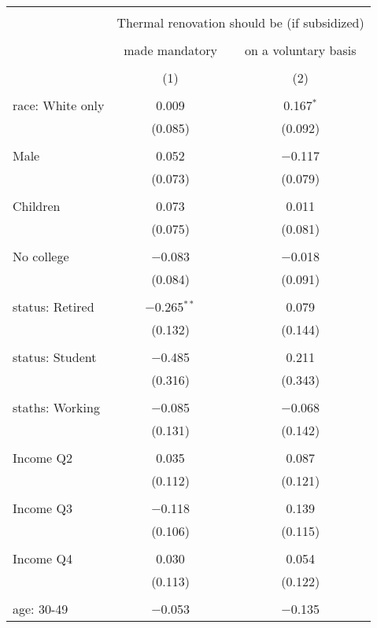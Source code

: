 
\begin{tabular}{@{\extracolsep{5pt}}lcc} 
\\[-1.8ex]\hline 
\hline \\[-1.8ex] 
 & \multicolumn{2}{c}{Thermal renovation should be (if subsidized)} \\ 
\cline{2-3} 
\\[-1.8ex] & made mandatory & on a voluntary basis \\ 
\\[-1.8ex] & (1) & (2)\\ 
\hline \\[-1.8ex] 
 race: White only & 0.009 & 0.167$^{*}$ \\ 
  & (0.085) & (0.092) \\ 
  & & \\ 
 Male & 0.052 & $-$0.117 \\ 
  & (0.073) & (0.079) \\ 
  & & \\ 
 Children & 0.073 & 0.011 \\ 
  & (0.075) & (0.081) \\ 
  & & \\ 
 No college & $-$0.083 & $-$0.018 \\ 
  & (0.084) & (0.091) \\ 
  & & \\ 
 status: Retired & $-$0.265$^{**}$ & 0.079 \\ 
  & (0.132) & (0.144) \\ 
  & & \\ 
 status: Student & $-$0.485 & 0.211 \\ 
  & (0.316) & (0.343) \\ 
  & & \\ 
 staths: Working & $-$0.085 & $-$0.068 \\ 
  & (0.131) & (0.142) \\ 
  & & \\ 
 Income Q2 & 0.035 & 0.087 \\ 
  & (0.112) & (0.121) \\ 
  & & \\ 
 Income Q3 & $-$0.118 & 0.139 \\ 
  & (0.106) & (0.115) \\ 
  & & \\ 
 Income Q4 & 0.030 & 0.054 \\ 
  & (0.113) & (0.122) \\ 
  & & \\ 
 age: 30-49 & $-$0.053 & $-$0.135 \\ 

\end{tabular}
